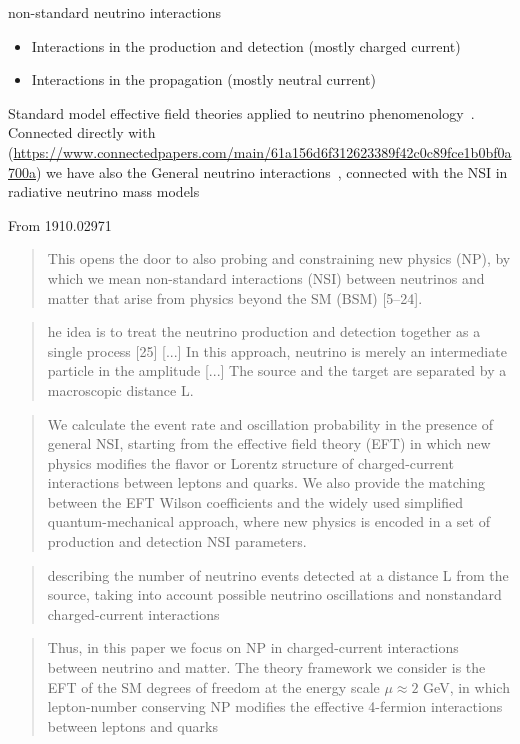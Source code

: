 \documentclass[a4paper,10pt,epsfig,epsf,amsfonts,amsmath]{article}
\begin{document}
\begin{ideas}

non-standard neutrino interactions
\begin{itemize}
    \item Interactions in the production and detection (mostly charged current)
    \item Interactions in the propagation (mostly neutral current)
\end{itemize}

Standard model effective field theories applied to neutrino phenomenology~\cite{1901.04553,1910.02971,2011.14292}.
Connected directly with~\cite{1901.04553} (\url{https://www.connectedpapers.com/main/61a156d6f312623389f42c0c89fce1b0bf0a700a}) we have also the General neutrino interactions~\cite{1905.08699}, 
connected with the NSI in radiative neutrino mass models~\cite{1907.09498}

From 1910.02971
\begin{quote}
    This opens the door to also probing and constraining new physics (NP), by which we
mean non-standard interactions (NSI) between neutrinos and matter that arise from physics
beyond the SM (BSM) [5–24]. 
\end{quote}
\begin{quote}
    he idea is to treat the neutrino production and detection together as a single process [25]
    [...]    
    In this approach,
neutrino is merely an intermediate particle in the amplitude [...]
The source and the target are separated by a macroscopic distance L.
\end{quote}
\begin{quote}
    We calculate the event rate and oscillation
probability in the presence of general NSI, starting from the effective field theory (EFT) in
which new physics modifies the flavor or Lorentz structure of charged-current interactions
between leptons and quarks. We also provide the matching between the EFT Wilson coefficients and the widely used simplified quantum-mechanical approach, where new physics
is encoded in a set of production and detection NSI parameters.
\end{quote}
\begin{quote}
    describing the number of neutrino
events detected at a distance L from the source, taking into account possible neutrino
oscillations and nonstandard charged-current interactions
\end{quote}
\begin{quote}
    Thus, in this paper we focus on NP in charged-current interactions between neutrino
and matter. The theory framework we consider is the EFT of the SM degrees of freedom at
the energy scale $\mu \approx 2$ GeV, in which lepton-number conserving NP modifies the effective
4-fermion interactions between leptons and quarks
\end{quote}


\end{ideas}
\end{document}
